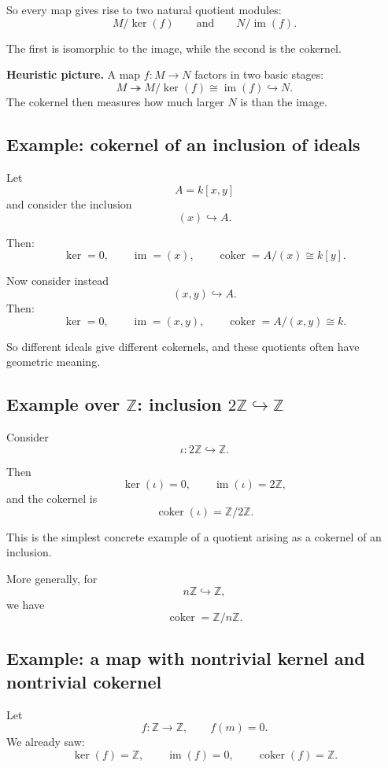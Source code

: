 \documentclass[12pt,a4paper]{article}
\theoremstyle{notespace}
\theoremstyle{definition}
\begin{document}
So every map gives rise to two natural quotient modules:
\[
M/\ker(f)
\qquad\text{and}\qquad
N/\operatorname{im}(f).
\]

The first is isomorphic to the image, while the second is the cokernel.

\medskip

\textbf{Heuristic picture.}
A map \(f:M\to N\) factors in two basic stages:
\[
M \twoheadrightarrow M/\ker(f) \cong \operatorname{im}(f) \hookrightarrow N.
\]
The cokernel then measures how much larger \(N\) is than the image.

\subsection{ Example: cokernel of an inclusion of ideals}

Let
\[
A=k[x,y]
\]
and consider the inclusion
\[
(x)\hookrightarrow A.
\]

Then:
\[
\ker=0,
\qquad
\operatorname{im}=(x),
\qquad
\operatorname{coker}=A/(x)\cong k[y].
\]

Now consider instead
\[
(x,y)\hookrightarrow A.
\]
Then:
\[
\ker=0,
\qquad
\operatorname{im}=(x,y),
\qquad
\operatorname{coker}=A/(x,y)\cong k.
\]

So different ideals give different cokernels, and these quotients often have geometric meaning.

\subsection{ Example over \(\mathbb Z\): inclusion \(2\mathbb Z\hookrightarrow \mathbb Z\)}

Consider
\[
\iota:2\mathbb Z\hookrightarrow \mathbb Z.
\]

Then
\[
\ker(\iota)=0,
\qquad
\operatorname{im}(\iota)=2\mathbb Z,
\]
and the cokernel is
\[
\operatorname{coker}(\iota)=\mathbb Z/2\mathbb Z.
\]

This is the simplest concrete example of a quotient arising as a cokernel of an inclusion.

More generally, for
\[
n\mathbb Z\hookrightarrow \mathbb Z,
\]
we have
\[
\operatorname{coker}=\mathbb Z/n\mathbb Z.
\]

\subsection{ Example: a map with nontrivial kernel and nontrivial cokernel}

Let
\[
f:\mathbb Z\longrightarrow \mathbb Z,
\qquad
f(m)=0.
\]
We already saw:
\[
\ker(f)=\mathbb Z,
\qquad
\operatorname{im}(f)=0,
\qquad
\operatorname{coker}(f)=\mathbb Z.
\]
\end{document}
